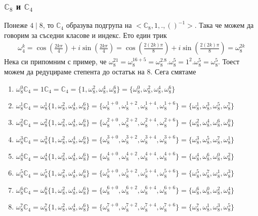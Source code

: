 \documentclass[12pt]{article}
\begin{document}
\subsubsection{\(\mathbb{C}_8\) и \(\mathbb{C}_4\)}
Понеже \(4 \mid 8\), то \(\mathbb{C}_4\) образува подгрупа на \(<\mathbb{C}_8, 1, . , ()^{-1}>\). Така че можем да говорим за съседни класове и индекс.
Ето един трик
\begin{align*}
    \omega_4^k = \cos\left(\displaystyle\frac{2k\pi}{4}\right) + i\sin\left(\displaystyle\frac{2k\pi}{4}\right) = \cos\left(\displaystyle\frac{2(2k)\pi}{8}\right) + i\sin\left(\displaystyle\frac{2(2k)\pi}{8}\right) = \omega_8^{2k}
\end{align*}
Нека си припомним с пример, че \(\omega_8^{21} = \omega_8^{16 + 5} = \omega_8^{2.8}.\omega_8^5 = 1^2.\omega_8^5 = \omega_8^5\).
Тоест можем да редуцираме степента до остатък на \(8\). Сега смятаме
\begin{enumerate}
    \item \(\omega_8^0\mathbb{C}_4 = 1\mathbb{C}_4 = \mathbb{C}_4 = \{1, \omega_8^2, \omega_8^4, \omega_8^6\} = \{\omega_8^0, \omega_8^2, \omega_8^4, \omega_8^6\}\)
    \item \(\omega_8^1\mathbb{C}_4 = \omega_8^1\{1, \omega_8^2, \omega_8^4, \omega_8^6\} = \{\omega_8^{1 + 0}, \omega_8^{1 + 2}, \omega_8^{1 + 4}, \omega_8^{1 + 6}\} = \{\omega_8^1, \omega_8^3, \omega_8^5, \omega_8^7\}\)
    \item \(\omega_8^2\mathbb{C}_4 = \omega_8^2\{1, \omega_8^2, \omega_8^4, \omega_8^6\} = \{\omega_8^{2 + 0}, \omega_8^{2 + 2}, \omega_8^{2 + 4}, \omega_8^{2 + 6}\} = \{\omega_8^2, \omega_8^4, \omega_8^6, \omega_8^0\}\)
    \item \(\omega_8^3\mathbb{C}_4 = \omega_8^3\{1, \omega_8^2, \omega_8^4, \omega_8^6\} = \{\omega_8^{3 + 0}, \omega_8^{3 + 2}, \omega_8^{3 + 4}, \omega_8^{3 + 6}\} = \{\omega_8^3, \omega_8^5, \omega_8^7, \omega_8^1\}\)
    \item \(\omega_8^4\mathbb{C}_4 = \omega_8^4\{1, \omega_8^2, \omega_8^4, \omega_8^6\} = \{\omega_8^{4 + 0}, \omega_8^{4 + 2}, \omega_8^{4 + 4}, \omega_8^{4 + 6}\} = \{\omega_8^4, \omega_8^6, \omega_8^0, \omega_8^2\}\)
    \item \(\omega_8^5\mathbb{C}_4 = \omega_8^5\{1, \omega_8^2, \omega_8^4, \omega_8^6\} = \{\omega_8^{5 + 0}, \omega_8^{5 + 2}, \omega_8^{5 + 4}, \omega_8^{5 + 6}\} = \{\omega_8^5, \omega_8^7, \omega_8^1, \omega_8^3\}\)
    \item \(\omega_8^6\mathbb{C}_4 = \omega_8^6\{1, \omega_8^2, \omega_8^4, \omega_8^6\} = \{\omega_8^{6 + 0}, \omega_8^{6 + 2}, \omega_8^{6 + 4}, \omega_8^{6 + 6}\} = \{\omega_8^6, \omega_8^0, \omega_8^2, \omega_8^4\}\)
    \item \(\omega_8^7\mathbb{C}_4 = \omega_8^7\{1, \omega_8^2, \omega_8^4, \omega_8^6\} = \{\omega_8^{7 + 0}, \omega_8^{7 + 2}, \omega_8^{7 + 4}, \omega_8^{7 + 6}\} = \{\omega_8^7, \omega_8^1, \omega_8^3, \omega_8^5\}\)
\end{enumerate}
\end{document}
